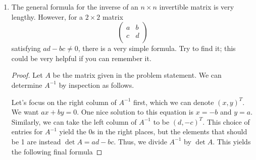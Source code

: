 \documentclass[../psets.tex]{subfiles}
\begin{document}
\begin{enumerate}
\begin{proof}
        \begin{equation*}
            \mu(\varphi) = \epsilon\cos(\varphi-\varphi_0)
        \end{equation*}
        for $\epsilon,\varphi_0\in\R$. By inspection, we can take as our particular solution to the inhomogeneous system
        \begin{equation*}
            \mu(\varphi) = \frac{GM}{l_0^2}
        \end{equation*}
        since it's second derivative (as a constant) is zero and it is the opposite of the inhomogeneous term. Thus, the general solution to the original inhomogeneous system is
        \begin{align*}
            \mu(\varphi) &= \frac{GM}{l_0^2}+\epsilon\cos(\varphi-\varphi_0)\\
            r(\varphi) &= \frac{1}{GM/l_0^2+\epsilon\cos(\varphi-\varphi_0)}\\
            &= \frac{\epsilon(l_0^2/GM\epsilon)}{1+\epsilon\cos(\varphi-\varphi_0)}
        \end{align*}
        which is exactly the polar form of the conic section with eccentricity $\epsilon$ and directrix $l_0^2/GM\epsilon$.
    \end{proof}
    \item The general formula for the inverse of an $n\times n$ invertible matrix is very lengthy. However, for a $2\times 2$ matrix
    \begin{equation*}
        \begin{pmatrix}
            a & b\\
            c & d\\
        \end{pmatrix}
    \end{equation*}
    satisfying $ad-bc\neq 0$, there is a very simple formula. Try to find it; this could be very helpful if you can remember it.
    \begin{proof}
        Let $A$ be the matrix given in the problem statement. We can determine $A^{-1}$ by inspection as follows.\par
        Let's focus on the right column of $A^{-1}$ first, which we can denote $(x,y)^T$. We want $ax+by=0$. One nice solution to this equation is $x=-b$ and $y=a$. Similarly, we can take the left column of $A^{-1}$ to be $(d,-c)^T$. This choice of entries for $A^{-1}$ yield the 0s in the right places, but the elements that should be 1 are instead $\det A=ad-bc$. Thus, we divide $A^{-1}$ by $\det A$. This yields the following final formula

\end{proof}
\end{enumerate}
\end{document}
